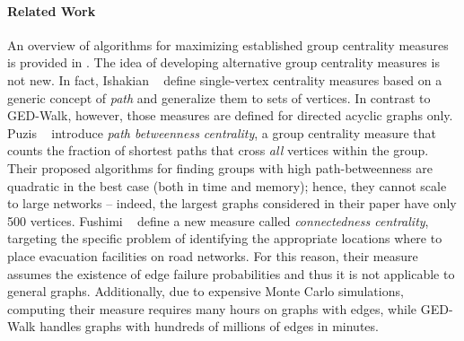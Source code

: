 
\paragraph{Related Work}
%
An overview of algorithms for maximizing established group centrality measures
is provided in .
The idea of developing alternative group centrality measures is not new. In fact, Ishakian
\etal~\cite{DBLP:conf/sdm/IshakianETB12} define single-vertex centrality measures based on
a generic concept of \emph{path} and generalize them to sets of vertices. In contrast
to GED-Walk, however, those measures are defined for directed acyclic graphs only.
Puzis \etal~\cite{puzis2007fast} introduce \emph{path betweenness centrality}, a group
centrality measure that counts the fraction of shortest paths that cross \emph{all}
vertices within the group.
Their proposed algorithms for finding groups with high path-betweenness are quadratic
in the best case (both in time and memory); hence, they cannot scale to large
networks -- indeed, the largest graphs considered in their paper have only 500 vertices.
Fushimi \etal~\cite{DBLP:conf/complexnetworks/FushimiSIK18} define a new
measure called \emph{connectedness centrality}, targeting the specific problem
of identifying the appropriate locations where to place evacuation facilities on
road networks. For this reason, their measure assumes the existence of edge failure
probabilities and thus it is not applicable to general graphs. Additionally,
due to expensive Monte Carlo simulations, computing their measure requires many
hours on graphs with  edges, while GED-Walk handles graphs with
hundreds of millions of edges in minutes.

